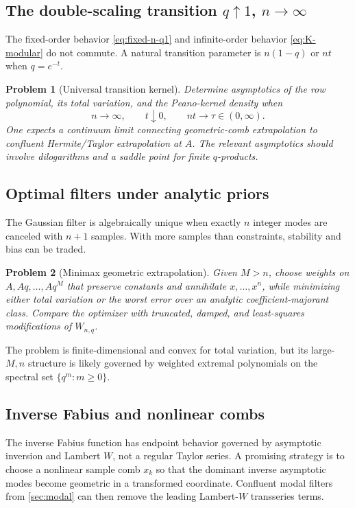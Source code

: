 \documentclass[11pt,oneside]{article}
\numberwithin{equation}{section}
\newtheorem{problem}[problem]{Problem}
\theoremstyle{definition}
\theoremstyle{remark}
\begin{document}
\subsection{The double-scaling transition $q\uparrow1$, $n\to\infty$}

The fixed-order behavior \eqref{eq:fixed-n-q1} and infinite-order behavior
\eqref{eq:K-modular} do not commute.  A natural transition parameter is
$n(1-q)$ or $nt$ when $q=e^{-t}$.

\begin{problem}[Universal transition kernel]
Determine asymptotics of the row polynomial, its total variation, and the
Peano-kernel density when
\[
 n\to\infty,\qquad t\downarrow0,
 \qquad nt\to\tau\in(0,\infty).
\]
One expects a continuum limit connecting geometric-comb extrapolation to
confluent Hermite/Taylor extrapolation at $A$.  The relevant asymptotics should
involve dilogarithms and a saddle point for finite $q$-products.
\end{problem}

\subsection{Optimal filters under analytic priors}

The Gaussian filter is algebraically unique when exactly $n$ integer modes are
canceled with $n+1$ samples.  With more samples than constraints, stability and
bias can be traded.

\begin{problem}[Minimax geometric extrapolation]
Given $M>n$, choose weights on $A,Aq,\ldots,Aq^M$ that preserve constants and
annihilate $x,\ldots,x^n$, while minimizing either total variation or the worst
error over an analytic coefficient-majorant class.  Compare the optimizer with
truncated, damped, and least-squares modifications of $W_{n,q}$.
\end{problem}

The problem is finite-dimensional and convex for total variation, but its
large-$M,n$ structure is likely governed by weighted extremal polynomials on
the spectral set $\{q^m:m\ge0\}$.

\subsection{Inverse Fabius and nonlinear combs}

The inverse Fabius function has endpoint behavior governed by asymptotic
inversion and Lambert $W$, not a regular Taylor series.  A promising strategy is
to choose a nonlinear sample comb $x_k$ so that the dominant inverse asymptotic
modes become geometric in a transformed coordinate.  Confluent modal filters
from \cref{sec:modal} can then remove the leading Lambert-$W$ transseries terms.
\end{document}
